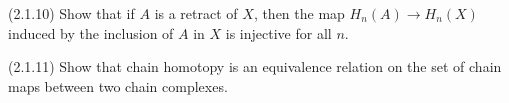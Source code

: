 \documentclass[12pt]{article}
\begin{document}
\begin{problem}{4}
    (2.1.10) Show that if $A$ is a retract of $X$, then the map $H_n(A) \to H_n(X)$ induced by the inclusion of $A$ in $X$ is injective for all $n$. 
\end{problem}

\begin{solution}
\end{solution}
\newpage

\begin{problem}{5}
    (2.1.11) Show that chain homotopy is an equivalence relation on the set of chain maps between two chain complexes.
\end{problem}

\begin{solution}
\end{solution}
\end{document}
